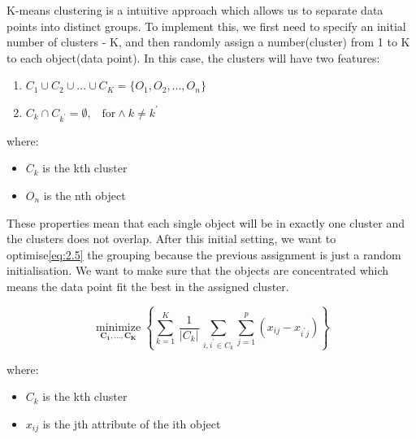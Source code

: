 \documentclass[11pt]{article} %
\theoremstyle{plain}
\theoremstyle{definition}
\begin{document}
K-means clustering is a intuitive approach which allows us to separate data points into distinct groups. To implement this, we first need to specify an initial number of clusters - K, and then randomly assign a number(cluster) from 1 to K to each object(data point). In this case, the clusters will have two features\cite{james/itsl:2009}:
{
  \begin{enumerate}
    \item ${C_1}\cup{C_2}\cup...\cup{C_K} = \{{O_1}, {O_2},..., {O_n}\}$
    \item ${C_k}\cap{C_{k^\prime}} = \emptyset \text{,}\quad \text{for} \wedge k \neq k^\prime$
  \end{enumerate}

  \footnotesize
  where:
    \begin{itemize}[label=-, leftmargin=4em, itemsep=0.1em]
      \item ${C_k}$ is the kth cluster
      \item ${O_n}$ is the nth object
    \end{itemize}
}

These properties mean that each single object will be in exactly one cluster and the clusters does not overlap. After this initial setting, we want to optimise\eqref{eq:2.5} the grouping because the previous assignment is just a random initialisation. We want to make sure that the objects are concentrated which means the data point fit the best in the assigned cluster. 

{
  \begin{equation}
    \label{eq:2.5}
    \tag{2.5}
    {{\underset {\mathbf {C_1,...,C_K} }{\operatorname {minimize} }}\left\{\sum _{k=1}^{K}\,{\frac {1}{|C_{k}|}}\,\sum _{ {i} , {i^\prime} \in C_{k}}\sum_{j=1}^{p}(x_{ij}-x_{{i^\prime}j})\right\}}
  \end{equation}

  \footnotesize
  where:
  \begin{itemize}[label=-, leftmargin=4em, itemsep=0.1em]
    \item ${C_k}$ is the kth cluster
    \item ${x_{ij}}$ is the jth attribute of the ith object
  \end{itemize}
}
\end{document}
